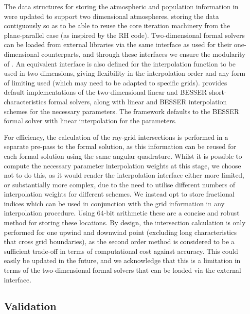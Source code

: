 The data structures for storing the atmospheric and population information in \Lw{} were updated to support two dimensional atmospheres, storing the data contiguously so as to be able to reuse the core iteration machinery from the plane-parallel case (as inspired by the RH code).
Two-dimensional formal solvers can be loaded from external libraries via the same interface as used for their one-dimensional counterparts, and through these interfaces we ensure the modularity of \Lw{}.
An equivalent interface is also defined for the interpolation function to be used in two-dimensions, giving flexibility in the interpolation order and any form of limiting used (which may need to be adapted to specific grids).
\Lw{} provides default implementations of the two-dimensional linear and BESSER short-characteristics formal solvers, along with linear and BESSER interpolation schemes for the necessary parameters.
The framework defaults to the BESSER formal solver with linear interpolation for the parameters.

For efficiency, the calculation of the ray-grid intersections is performed in a separate pre-pass to the formal solution, as this information can be reused for each formal solution using the same angular quadrature.
Whilst it is possible to compute the necessary parameter interpolation weights at this stage, we choose not to do this, as it would render the interpolation interface either more limited, or substantially more complex, due to the need to utilise different numbers of interpolation weights for different schemes.
We instead opt to store fractional indices which can be used in conjunction with the grid information in any interpolation procedure.
Using 64-bit arithmetic these are a concise and robust method for storing these locations.
By design, the intersection calculation is only performed for one upwind and downwind point
(excluding long characteristics that cross grid boundaries), as the second order method is considered to be a sufficient trade-off in terms of computational cost against accuracy.
This could easily be updated in the future, and we acknowledge that this is a limitation in terms of the two-dimensional formal solvers that can be loaded via the external interface.


\subsection{Validation}

